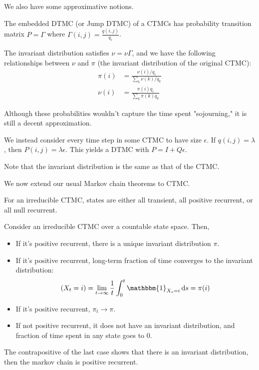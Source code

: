 We also have some approximative notions.

\begin{definition}
   The embedded DTMC (or Jump DTMC) of a CTMCs has probability transition matrix $P = \Gamma$ where $\Gamma(i, j) = \frac{q(i, j)}{q_i}$.

   The invariant distribution satisfies $\nu = \nu \Gamma$, and we have the following relationships between $\nu$ and $\pi$ (the invariant distribution of
   the original CTMC):
   \begin{align*}
       \pi(i) &= \frac{\nu(i)/q_i}{\sum_k \nu(k)/q_k} \\
       \nu(i) &= \frac{\pi(i) q_i}{\sum_k \pi(k) q_k}
   \end{align*}
\end{definition}

Although these
probabilities wouldn't capture the time spent "sojourning," it is still a decent approximation.

\begin{definition}
    We instead consider every time step in some CTMC to have size $\epsilon$. If $q(i, j) = \lambda$, then $P(i, j) = \lambda \epsilon$.
    This yields a DTMC with $P = I + Q\epsilon$.

    Note that the invariant distribution is the same as that of the CTMC.
\end{definition}

We now extend our usual Markov chain theorems to CTMC.

\begin{theorem}
    For an irreducible CTMC, states are either all transient, all positive recurrent, or all null recurrent.
\end{theorem}

\begin{theorem}
    Consider an irreducible CTMC over a countable state space. Then,
    \begin{itemize}
        \item If it's positive recurrent, there is a unique invariant distribution $\pi$.
        \item If it's positive recurrent, long-term fraction of time converges to the invariant distribution:
        \[ (X_t = i) = \lim_{t \to \infty} \frac{1}{t} \int_0^{t} \mathbbm{1}_{X_s = i} \dd{s} = \pi(i) \]
        \item If it's positive recurrent, $\pi_t \to \pi$.
        \item If not positive recurrent, it does not have an invariant distribution, and fraction of time spent in any state goes to 0.
    \end{itemize}
    The contrapositive of the last case shows that there is an invariant distribution, then the markov chain is positive recurrent.
\end{theorem}

